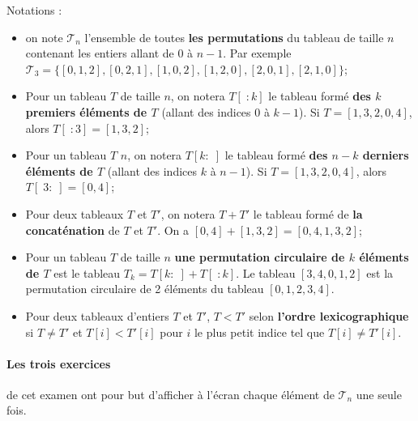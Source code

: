 \documentclass{article}
\theoremstyle{exostyle}
\theoremstyle{partiestyle}
\theoremstyle{questionstyle}
\begin{document}
\vspace*{1cm}
Notations :
\begin{itemize}
\item on note $\mathcal{T}_n$ l'ensemble de toutes {\bf les permutations} du tableau de taille $n$ contenant les entiers allant de $0$ à $n-1$. Par exemple $\mathcal{T}_3 = \{[0, 1, 2], [0, 2, 1], [1, 0, 2], [1, 2, 0], [2, 0, 1], [2, 1, 0]\}$;
\item Pour un tableau $T$ de taille $n$, on notera $T[\;:k]$ le tableau formé {\bf des $k$ premiers éléments de $T$} (allant des indices 0 à $k-1$). Si $T=[1, 3, 2, 0, 4]$, alors $T[\;:3] = [1, 3, 2]$;
\item Pour un tableau $T$ $n$, on notera $T[k:\;]$ le tableau formé {\bf des $n-k$ derniers éléments de $T$} (allant des indices $k$ à $n-1$). Si $T=[1, 3, 2, 0, 4]$, alors $T[\;3:\;] = [0, 4]$;
\item Pour deux tableaux $T$ et $T'$, on notera $T + T'$ le tableau formé de {\bf la concaténation} de $T$ et $T'$. On a $[0, 4] + [1, 3, 2] = [0, 4, 1, 3, 2]$;
\item Pour un tableau $T$ de taille $n$ {\bf une permutation circulaire de $k$ éléments de $T$} est le tableau $T_k = T[k:\;] + T[\;:k]$. Le tableau $[3, 4, 0, 1, 2]$ est la permutation circulaire de 2 éléments du tableau $[0, 1, 2, 3, 4]$.
\item Pour deux tableaux d'entiers $T$ et $T'$, $T < T'$ selon {\bf l'ordre lexicographique} si $T \neq T'$ et $T[i] < T'[i]$ pour $i$ le plus petit indice tel que $T[i] \neq T'[i]$.
\end{itemize}

\paragraph{Les trois exercices} de cet examen ont pour but d'afficher à l'écran chaque élément de $\mathcal{T}_n$ une seule fois. 

\clearpage
\end{document}
